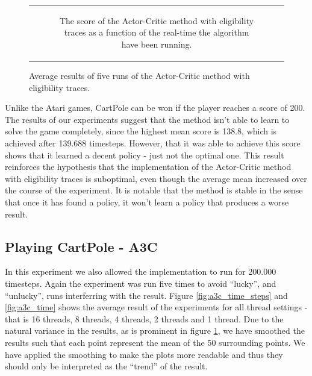 \documentclass[11pt]{article}
\begin{document}
\begin{figure}[H]
\begin{tabular}[c]{c}
\begin{subfigure}{\textwidth}
        \caption{The score of the Actor-Critic method with eligibility
            traces as a function of the real-time the algorithm
            have been running.}
    \end{subfigure}
    \end{tabular}
    \caption{Average results of five runs of the Actor-Critic method
    with eligibility traces.} 
     \label{fig:cp_et}
\end{figure}

Unlike the Atari games, CartPole can be won if the player reaches a score of 200.
The results of our experiments suggest that
the method isn't able to learn to solve the game completely,
since the highest mean score is 138.8, which is achieved after 139.688 timesteps.
However, that it was able to achieve this score shows
that it learned a decent policy - just not the optimal one.
This result reinforces the hypothesis that the implementation of the
Actor-Critic method with eligibility traces is suboptimal, even
though the average mean increased over the course of the experiment.
It is notable that the method is stable in the sense that once it has found
a policy, it won't learn a policy that produces a worse result.


\subsection{Playing CartPole - A3C}

In this experiment we also allowed the implementation to run for
200.000 timesteps.
Again the experiment was run five times to avoid “lucky”, and “unlucky”, runs
interferring with the result. 
Figure \ref{fig:a3c_time_steps} and \ref{fig:a3c_time} shows the average result of the experiments for all thread settings - that is 16 threads, 8 threads, 4 threads,
2 threads and 1 thread.
Due to the natural variance in the results, as is prominent in figure \ref{fig:cp_et},
we have smoothed the results such that each point represent the mean of the 50
surrounding points.
We have applied the smoothing to make the plots more readable and
thus they should only be interpreted as the “trend” of the
result.
\end{document}
